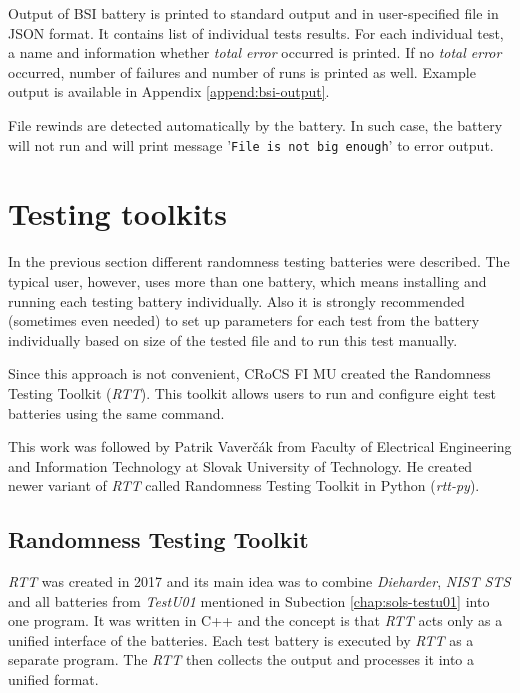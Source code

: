 \documentclass[
  digital,     %
  oneside,     %
  nosansbold,  %
  nocolorbold, %
  nolof,         %
  nolot,         %
]{fithesis4}
\begin{document}
Output of BSI battery is printed to standard output and in user-specified file in JSON format. It contains list of individual tests results. For each individual test, a name and information whether \emph{total error} occurred is printed. If no \emph{total error} occurred, number of failures and number of runs is printed as well. Example output is available in Appendix \ref{append:bsi-output}.

File rewinds are detected automatically by the battery. In such case, the battery will not run and will print message 
'\texttt{File is not big enough}' to error output.



\section{Testing toolkits}\label{chap:sols-toolkits}
In the previous section different randomness testing batteries were described. The typical user, however, uses more than one battery, which means installing and running each testing battery individually. Also it is strongly recommended (sometimes even needed) to set up parameters for each test from the battery individually based on size of the tested file and to run this test manually.

Since this approach is not convenient,  CRoCS FI MU created the Randomness Testing Toolkit (\emph{RTT}).\cite{rtt-obratil} This toolkit allows users to run and configure eight test batteries using the same command.

This work was followed by Patrik Vaverčák from Faculty of Electrical Engineering and Information Technology at Slovak University of Technology. He created newer variant of \emph{RTT} called Randomness Testing Toolkit in Python (\emph{rtt-py}). \cite{vavercak}

\subsection{Randomness Testing Toolkit} \label{chap:sols-rtt}

\emph{RTT} was created in 2017 and its main idea was to combine \emph{Dieharder}, \emph{NIST STS} and all batteries from \emph{TestU01} mentioned in Subection \ref{chap:sols-testu01} into one program. It was written in C++ and the concept is that \emph{RTT} acts only as a unified interface of the batteries. Each test battery is executed by \emph{RTT} as a separate program. The \emph{RTT} then collects the output and processes it into a unified format.~\cite[p.~8]{rtt-obratil}
\end{document}

